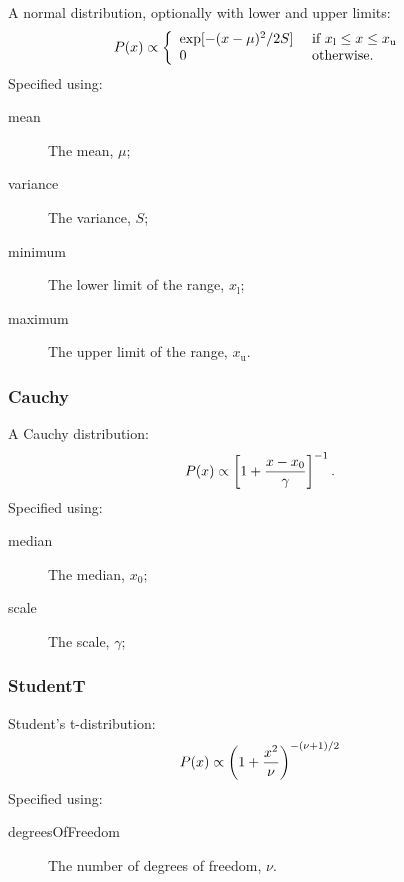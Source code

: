 A normal distribution, optionally with lower and upper limits:
\begin{equation}
P(x) \propto \left\{ \begin{array}{ll} \exp[-(x-\mu)^2/2S] & \hbox{ if } x_\mathrm{l} \leq x \leq x_\mathrm{u} \\ 0 & \hbox{ otherwise.}  \end{array} \right.
\end{equation}
Specified using:
\begin{description}
\item[{\normalfont \ttfamily mean}] The mean, $\mu$;
\item[{\normalfont \ttfamily variance}] The variance, $S$;
\item[{\normalfont \ttfamily minimum}] The lower limit of the range, $x_\mathrm{l}$;
\item[{\normalfont \ttfamily maximum}] The upper limit of the range, $x_\mathrm{u}$.
\end{description}

\subsubsection{{\normalfont \ttfamily Cauchy}}

A Cauchy distribution:
\begin{equation}
P(x) \propto \left[1+{x-x_0\over\gamma}\right]^{-1}.
\end{equation}
Specified using:
\begin{description}
\item[{\normalfont \ttfamily median}] The median, $x_0$;
\item[{\normalfont \ttfamily scale}] The scale, $\gamma$;
\end{description}

\subsubsection{{\normalfont \ttfamily StudentT}}

Student's t-distribution:
\begin{equation}
P(x) \propto \left(1 + {x^2\over \nu}\right)^{-(\nu+1)/2}
\end{equation}
Specified using:
\begin{description}
\item[{\normalfont \ttfamily degreesOfFreedom}] The number of degrees of freedom, $\nu$.
\end{description}
